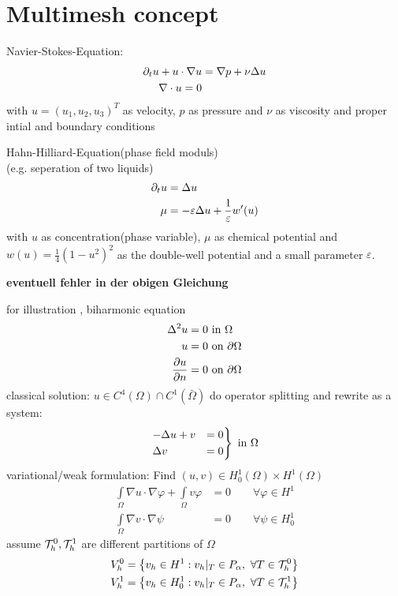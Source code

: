 \section{Multimesh concept}

\begin{example}
	Navier-Stokes-Equation:
	\begin{align*}
		\partial_t u + u \cdot \nabla u &= \nabla p + \nu \Delta u \\
		\nabla \cdot u = 0 
	\end{align*}
	with $u = (u_1,u_2,u_3)^T$ as velocity, $p$ as pressure and $\nu$ as viscosity and proper intial and boundary conditions
\end{example}

\begin{example}
	Hahn-Hilliard-Equation(phase field moduls)\\
	(e.g. seperation of two liquids)
	\begin{align*}
	\partial_t u &= \Delta u \\
	\mu &= -\varepsilon \Delta u + \frac{1}{\varepsilon}w'(u) 
	\end{align*}
	with $u$ as concentration(phase variable), $\mu$ as chemical potential and $w(u) = \frac{1}{4} (1-u^2)^2$ as the double-well potential and a small parameter $\varepsilon$.
\end{example}
\textbf{eventuell fehler in der obigen Gleichung}
\begin{example}
	for illustration , biharmonic equation
	\begin{align*}
	\Delta^2 u &= 0 \text{ in } \Omega \\
	u &= 0 \text{ on } \partial\Omega\\
	\frac{\partial u}{\partial n} &=0 \text{ on } \partial \Omega
	\end{align*}
	classical solution: $u \in C^4(\Omega)\cap C^1(\bar{\Omega})$\nl
	do operator splitting and rewrite as a system:
	\begin{align*}
		\begin{rcases}
			-\Delta u + v &=0\\
			\Delta v &= 0
		\end{rcases} \text{ in } \Omega
	\end{align*}
	variational/weak formulation: Find $(u,v) \in H^1_0(\Omega)\times H^1(\Omega)$
	\begin{align*}
		\int \limits_{\Omega} \nabla u \cdot \nabla \varphi + \int \limits_{\Omega} v\varphi &=0 \qquad \forall \varphi \in H^1\\
		\int \limits_{\Omega} \nabla v \cdot \nabla \psi &=0 \qquad \forall \psi \in H^1_0
	\end{align*}
	assume $\mathcal{T}^0_h, \mathcal{T}^1_h$ are different partitions of $\Omega$
	\begin{align*}
		V^0_h &= \left\{ v_h \in H^1: v_h|_T \in P_{\alpha},\ \forall T \in \T^0_h  \right\}\\
		V^1_h &= \left\{ v_h \in H^1_0: v_h|_T \in P_{\alpha},\ \forall T \in \T^1_h  \right\}
	\end{align*}
\end{example}
